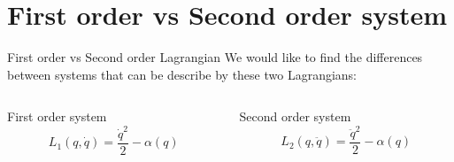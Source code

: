\documentclass[10pt]{beamer}
\begin{document}
  \section{First order vs Second order system}

  \begin{frame}{First order vs Second order Lagrangian}
    We would like to find the differences between systems that can be
    describe by these two Lagrangians:
    \vspace{0.5em}
    \begin{columns}
      \begin{column}{0.4\textwidth}
        \begin{center}
          \alert{First order system}
          \begin{equation*}
            L_1(q, \dot{q}) = \frac{\dot{q}^2}{2} - \alpha(q)
          \end{equation*}
        \end{center}
      \end{column}
      \begin{column}{0.4\textwidth}
        \begin{center}
          \alert{Second order system}
          \begin{equation*}
            L_2(q, \ddot{q}) = \frac{\ddot{q}^2}{2} - \alpha(q)
          \end{equation*}
        \end{center}
      \end{column}
    \end{columns}
  \end{frame}
\end{document}
